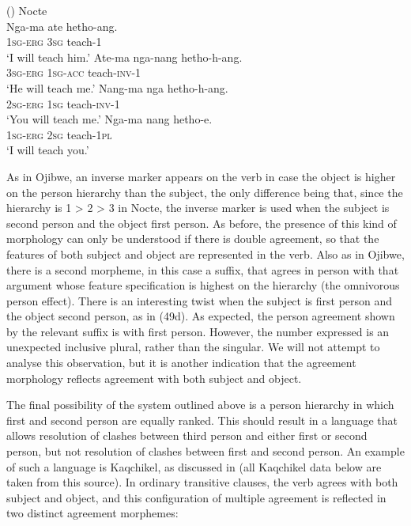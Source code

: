 \documentclass[output=paper]{langsci/langscibook}
\begin{document}
\ea (\label{bkm:Ref328735211})  Nocte\\
\ea\gll  Nga-ma  ate  hetho-ang.  \\
    1\textsc{sg-erg 3sg} teach-1\\
\glt    ‘I will teach him.’
\ex \gll  Ate-ma   nga-nang hetho-h-ang.\\
      3\textsc{sg-erg 1sg-acc} teach-\textsc{inv-1}\\
\glt     ‘He will teach me.’
\ex \gll Nang-ma nga hetho-h-ang.\\
      2\textsc{sg-erg  1sg} teach-\textsc{inv-1}\\
\glt     ‘You will teach me.’
\ex \gll Nga-ma  nang hetho-e.\\
     1\textsc{sg}{}-\textsc{erg} 2\textsc{sg} teach-1\textsc{pl}\\
\glt    ‘I will teach you.’
\z \z

As in Ojibwe, an inverse marker appears on the verb in case the object is higher on the person hierarchy than the subject, the only difference being that, since the hierarchy is 1 > 2 > 3 in Nocte, the inverse marker is used when the subject is second person and the object first person.  As before, the presence of this kind of morphology can only be understood if there is double agreement, so that the features of both subject and object are represented in the verb. Also as in Ojibwe, there is a second morpheme, in this case a suffix, that agrees in person with that argument whose feature specification is highest on the hierarchy (the omnivorous person effect). There is an interesting twist when the subject is first person and the object second person, as in (49d). As expected, the person agreement shown by the relevant suffix is with first person. However, the number expressed is an unexpected inclusive plural, rather than the singular. We will not attempt to analyse this observation, but it is another indication that the agreement morphology reflects agreement with both subject and object.

The final possibility of the system outlined above is a person hierarchy in which first and second person are equally ranked. This should result in a language that allows resolution of clashes between third person and either first or second person, but not resolution of clashes between first and second person. An example of such a language is Kaqchikel, as discussed in \citealt{Preminger2014} (all Kaqchikel data below are taken from this source). In ordinary transitive clauses, the verb agrees with both subject and object, and this configuration of multiple agreement is reflected in two distinct agreement morphemes:
\end{document}
